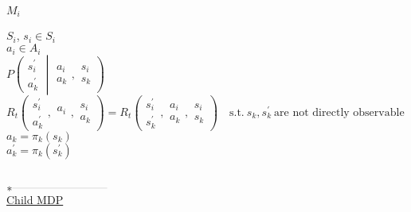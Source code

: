 \underline{$M_i$}\quad
\begin{minipage}[t]{5in}
$S_i $, $s_i\in S_i$\\
$a_i\in A_i$\\
$P\left(
\begin{array}{c} s^\prime_i \\ a^\prime_k \end{array}
\middle|
\begin{array}{c}a_i \\ a_k \end{array},
\begin{array}{c} s_i \\ s_k \end{array}
\right)$\\
$R_t\left( 
\begin{array}{c} s^\prime_i \\ a^\prime_k \end{array},
\begin{array}{c} a_i \\ \end{array},
\begin{array}{c} s_i \\ a_k \end{array}
\right)
=
R_t\left( 
\begin{array}{c} s^\prime_i \\ s^\prime_k \end{array},
\begin{array}{c} a_i \\ a_k\end{array},
\begin{array}{c} s_i \\ s_k \end{array}
\right)
\quad\text{
s.t.}\ s_k, s^\prime_k\ \text{are not directly observable}$\\
$a_k=\pi_k(s_k)$\\
$a^\prime_k=\pi_k(s^\prime_k)$
\end{minipage}\\

$\ast \rule[3pt]{3cm}{0.1pt}$\\


\underline{Child MDP}\\

